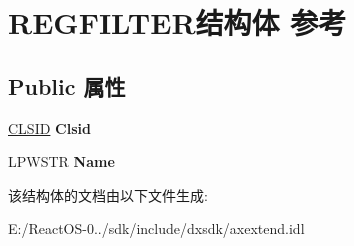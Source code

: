 \hypertarget{struct_r_e_g_f_i_l_t_e_r}{}\section{R\+E\+G\+F\+I\+L\+T\+E\+R结构体 参考}
\label{struct_r_e_g_f_i_l_t_e_r}
\subsection*{Public 属性}
\begin{DoxyCompactItemize}
\item 
\mbox{\label{struct_r_e_g_f_i_l_t_e_r_a350c186a42feb65dcb6870aa5a250ca0}} 
\hyperlink{struct___i_i_d}{C\+L\+S\+ID} {\bfseries Clsid}
\item 
\mbox{\label{struct_r_e_g_f_i_l_t_e_r_a76f94b2f1b25b80aa88356ff82a9e47c}} 
L\+P\+W\+S\+TR {\bfseries Name}
\end{DoxyCompactItemize}


该结构体的文档由以下文件生成\+:\begin{DoxyCompactItemize}
\item 
E\+:/\+React\+O\+S-\/0../sdk/include/dxsdk/axextend.\+idl\end{DoxyCompactItemize}
